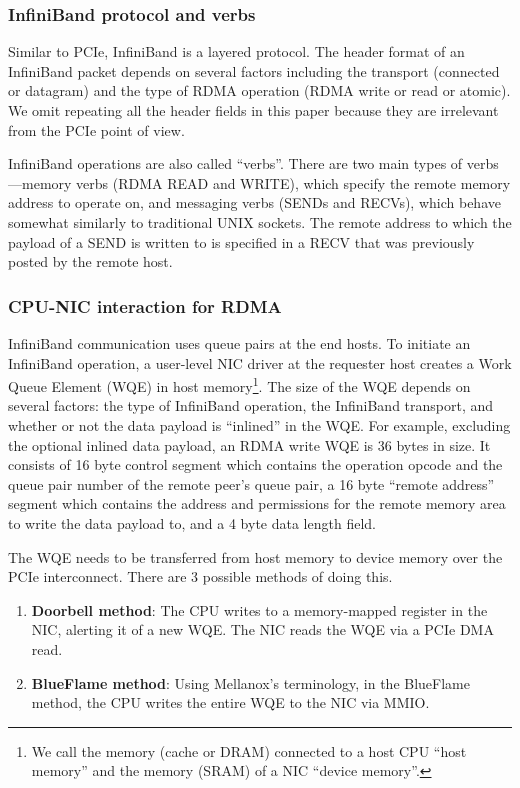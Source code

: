 \subsubsection{InfiniBand protocol and verbs}
Similar to PCIe, InfiniBand is a layered protocol. The header format of an
InfiniBand packet depends on several factors including the transport (connected
or datagram) and the type of RDMA operation (RDMA write or read or atomic). We
omit repeating all the header fields in this paper because they are irrelevant
from the PCIe point of view.

InfiniBand operations are also called ``verbs''. There are two main types of
verbs---memory verbs (RDMA READ and WRITE), which specify the remote memory
address to operate on, and messaging verbs (SENDs and RECVs), which behave
somewhat similarly to traditional UNIX sockets. The remote address to which the
payload of a SEND is written to is specified in a RECV that was previously
posted by the remote host.

\subsubsection{CPU-NIC interaction for RDMA}
InfiniBand communication uses queue pairs at the end hosts. To initiate an
InfiniBand operation, a user-level NIC driver at the requester host creates
a Work Queue Element (WQE) in host memory\footnote{We call the memory (cache
or DRAM) connected to a host CPU ``host memory'' and the memory (SRAM) of a NIC
``device memory''.}. The size of the WQE depends on several factors:
the type of InfiniBand operation, the InfiniBand transport, and whether or not
the data payload is ``inlined'' in the WQE. For example, excluding the optional
inlined data payload, an RDMA write WQE is 36 bytes in size. It consists of
16 byte control segment which contains the operation opcode and the queue pair
number of the remote peer's queue pair, a 16 byte ``remote address'' segment
which contains the address and permissions for the remote memory area to write
the data payload to, and a 4 byte data length field.


The WQE needs to be transferred from host memory to device memory over the
PCIe interconnect. There are 3 possible methods of doing this.

\begin{enumerate}
\item \textbf{Doorbell method}: The CPU writes to a memory-mapped register in
the NIC, alerting it of a new WQE. The NIC reads the WQE via a PCIe DMA read.
\item \textbf{BlueFlame method}: Using Mellanox's terminology, in the BlueFlame
method, the CPU writes the entire WQE to the NIC via MMIO.
\end{enumerate}
